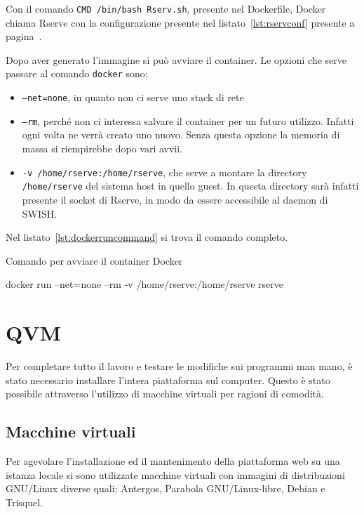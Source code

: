 \documentclass[10pt,titlepage,twoside,a4paper]{report}
\newenvironment{code}{\singlespacing\captionsetup{type=listing}}{}
\begin{document}
Con il comando \texttt{CMD /bin/bash Rserv.sh}, presente nel 
Dockerfile,
Docker chiama Rserve con la configurazione presente nel 
listato~\ref{lst:rservconf} presente a pagina~\pageref{lst:rservconf}.

Dopo aver generato l'immagine si può avviare il container.
Le opzioni che serve passare al comando \texttt{docker} sono:
\begin{itemize}
    \item  \texttt{--net=none}, in quanto non ci serve uno stack di rete
    \item  \texttt{--rm}, perché non ci interessa salvare il container per
           un futuro utilizzo. Infatti ogni volta ne verrà creato uno nuovo.
           Senza questa opzione la memoria di massa si riempirebbe dopo
           vari avvii.
    \item  \texttt{-v /home/rserve:/home/rserve}, che serve a montare 
           la directory \texttt{/home/rserve} del sistema host in quello guest.
           In questa directory sarà infatti presente il socket di Rserve,
           in modo da essere accessibile al daemon di SWISH.
\end{itemize}
Nel listato~\ref{lst:dockerruncommand} si trova il comando completo.

\begin{minipage}{\textwidth}
\centering
\begin{code}
    \caption{Comando per avviare il container Docker}
    \begin{shellcode*}{}
docker run --net=none --rm -v /home/rserve:/home/rserve rserve
    \end{shellcode*}
    \label{lst:dockerruncommand}
\end{code}
\end{minipage}


\section{QVM}
Per completare tutto il lavoro e testare le modifiche sui programmi man 
mano, è stato necessario installare l'intera piattaforma sul computer. 
Questo è stato possibile attraverso l'utilizzo di macchine virtuali 
per ragioni di comodità.

\subsection{Macchine virtuali}
Per agevolare l'installazione ed il mantenimento della piattaforma web su una 
istanza locale si sono utilizzate macchine virtuali con immagini di 
distribuzioni GNU/Linux diverse quali: Antergos, Parabola GNU/Linux-libre, 
Debian e Trisquel.
\end{document}
